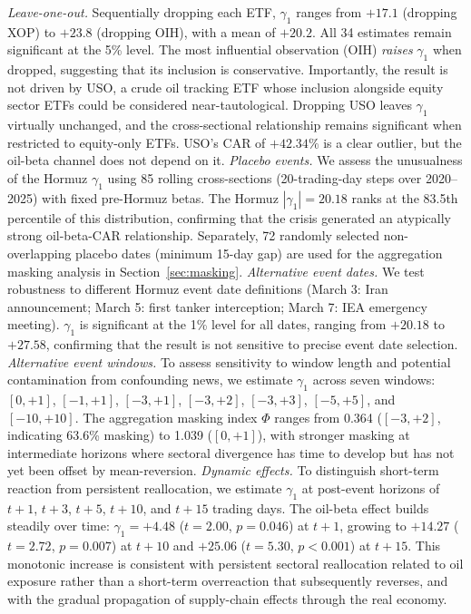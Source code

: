 \documentclass[12pt,preprint,authoryear]{elsarticle}
\begin{document}
\textit{Leave-one-out.} Sequentially dropping each ETF, $\gamma_1$ ranges from $+17.1$ (dropping XOP) to $+23.8$ (dropping OIH), with a mean of $+20.2$. All 34 estimates remain significant at the 5\% level. The most influential observation (OIH) \textit{raises} $\gamma_1$ when dropped, suggesting that its inclusion is conservative. Importantly, the result is not driven by USO, a crude oil tracking ETF whose inclusion alongside equity sector ETFs could be considered near-tautological. Dropping USO leaves $\gamma_1$ virtually unchanged, and the cross-sectional relationship remains significant when restricted to equity-only ETFs. USO's CAR of $+42.34\%$ is a clear outlier, but the oil-beta channel does not depend on it.
\textit{Placebo events.} We assess the unusualness of the Hormuz $\gamma_1$ using 85 rolling cross-sections (20-trading-day steps over 2020--2025) with fixed pre-Hormuz betas. The Hormuz $|\gamma_1| = 20.18$ ranks at the 83.5th percentile of this distribution, confirming that the crisis generated an atypically strong oil-beta-CAR relationship. Separately, 72 randomly selected non-overlapping placebo dates (minimum 15-day gap) are used for the aggregation masking analysis in Section~\ref{sec:masking}.
\textit{Alternative event dates.} We test robustness to different Hormuz event date definitions (March 3: Iran announcement; March 5: first tanker interception; March 7: IEA emergency meeting). $\gamma_1$ is significant at the 1\% level for all dates, ranging from $+20.18$ to $+27.58$, confirming that the result is not sensitive to precise event date selection.
\textit{Alternative event windows.} To assess sensitivity to window length and potential contamination from confounding news, we estimate $\gamma_1$ across seven windows: $[0,+1]$, $[-1,+1]$, $[-3,+1]$, $[-3,+2]$, $[-3,+3]$, $[-5,+5]$, and $[-10,+10]$. The aggregation masking index $\Phi$ ranges from 0.364 ($[-3,+2]$, indicating 63.6\% masking) to 1.039 ($[0,+1]$), with stronger masking at intermediate horizons where sectoral divergence has time to develop but has not yet been offset by mean-reversion.
\textit{Dynamic effects.} To distinguish short-term reaction from persistent reallocation, we estimate $\gamma_1$ at post-event horizons of $t+1$, $t+3$, $t+5$, $t+10$, and $t+15$ trading days. The oil-beta effect builds steadily over time: $\gamma_1 = +4.48$ ($t = 2.00$, $p = 0.046$) at $t+1$, growing to $+14.27$ ($t = 2.72$, $p = 0.007$) at $t+10$ and $+25.06$ ($t = 5.30$, $p < 0.001$) at $t+15$. This monotonic increase is consistent with persistent sectoral reallocation related to oil exposure rather than a short-term overreaction that subsequently reverses, and with the gradual propagation of supply-chain effects through the real economy.
\end{document}
